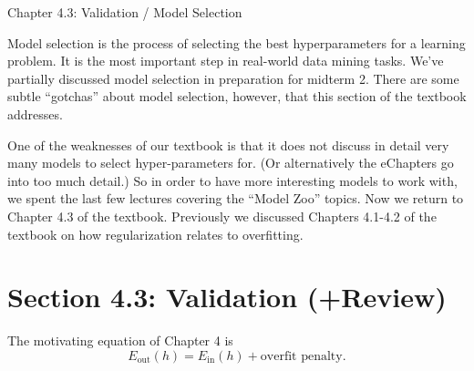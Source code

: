 \documentclass[10pt]{exam}
\theoremstyle{definition}
\newcommand{\Ein}{E_{\text{in}}}
\newcommand{\Eout}{E_{\text{out}}}
\begin{document}
\begin{center}
{
\Huge
Chapter 4.3: Validation / Model Selection
}
\end{center}


\noindent
Model selection is the process of selecting the best hyperparameters for a learning problem.
It is the most important step in real-world data mining tasks.
We've partially discussed model selection in preparation for midterm 2.
There are some subtle ``gotchas'' about model selection,
however, that this section of the textbook addresses.

One of the weaknesses of our textbook is that it does not discuss in detail very many models to select hyper-parameters for.
(Or alternatively the eChapters go into too much detail.)
So in order to have more interesting models to work with,
we spent the last few lectures covering the ``Model Zoo'' topics.
Now we return to Chapter 4.3 of the textbook.
Previously we discussed Chapters 4.1-4.2 of the textbook on how regularization relates to overfitting.

\section*{Section 4.3: Validation (+Review)}

The motivating equation of Chapter 4 is
\begin{equation}
    \Eout(h) = \Ein(h) + \text{overfit penalty}.
\end{equation}


\vspace{2in}
\end{document}
